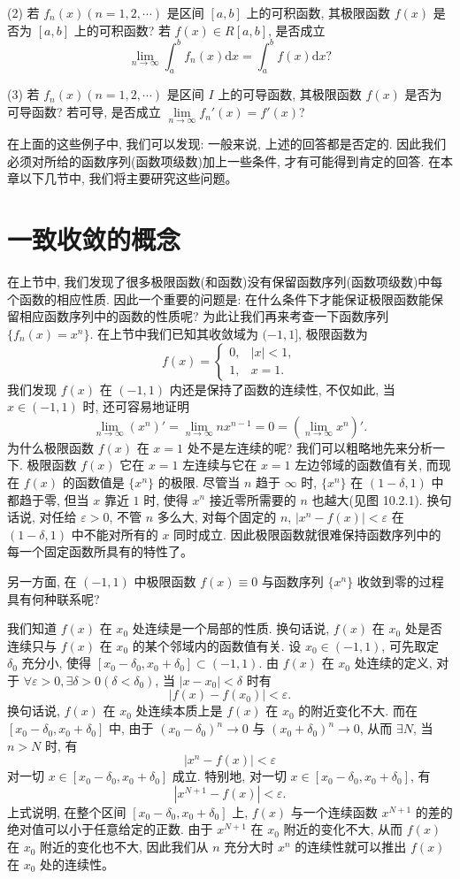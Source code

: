 \documentclass[UTF8,12pt,a4paper,fontset=fandol]{ctexart}
\begin{document}
(2) 若 $f_n(x)(n=1,2,\cdots)$ 是区间 $[a,b]$ 上的可积函数, 其极限函数 $f(x)$ 是否为 $[a,b]$ 上的可积函数? 若 $f(x)\in R[a,b]$, 是否成立
\[
  \lim_{n\to\infty}\int_a^b f_n(x)\mathrm dx=\int_a^b f(x)\mathrm dx?
\]

(3) 若 $f_n(x)(n=1,2,\cdots)$ 是区间 $I$ 上的可导函数, 其极限函数 $f(x)$ 是否为可导函数? 若可导, 是否成立 $\lim\limits_{n\to\infty}f_n'(x)=f'(x)$?

在上面的这些例子中, 我们可以发现: 一般来说, 上述的回答都是否定的. 因此我们必须对所给的函数序列(函数项级数)加上一些条件, 才有可能得到肯定的回答. 在本章以下几节中, 我们将主要研究这些问题。

\section{一致收敛的概念}

在上节中, 我们发现了很多极限函数(和函数)没有保留函数序列(函数项级数)中每个函数的相应性质. 因此一个重要的问题是: 在什么条件下才能保证极限函数能保留相应函数序列中的函数的性质呢? 为此让我们再来考查一下函数序列 $\{f_n(x)=x^n\}$. 在上节中我们已知其收敛域为 $(-1,1]$, 极限函数为
\[
  f(x)=
  \begin{cases}
    0, & |x|<1,\\
    1, & x=1.
  \end{cases}
\]
我们发现 $f(x)$ 在 $(-1,1)$ 内还是保持了函数的连续性, 不仅如此, 当 $x\in(-1,1)$ 时, 还可容易地证明
\[
  \lim_{n\to\infty}(x^n)'=\lim_{n\to\infty}nx^{n-1}=0=\left(\lim_{n\to\infty}x^n\right)'.
\]
为什么极限函数 $f(x)$ 在 $x=1$ 处不是左连续的呢? 我们可以粗略地先来分析一下. 极限函数 $f(x)$ 它在 $x=1$ 左连续与它在 $x=1$ 左边邻域的函数值有关, 而现在 $f(x)$ 的函数值是 $\{x^n\}$ 的极限. 尽管当 $n$ 趋于 $\infty$ 时, $\{x^n\}$ 在 $(1-\delta,1)$ 中都趋于零, 但当 $x$ 靠近 $1$ 时, 使得 $x^n$ 接近零所需要的 $n$ 也越大(见图 10.2.1). 换句话说, 对任给 $\varepsilon>0$, 不管 $n$ 多么大, 对每个固定的 $n$, $|x^n-f(x)|<\varepsilon$ 在 $(1-\delta,1)$ 中不能对所有的 $x$ 同时成立. 因此极限函数就很难保持函数序列中的每一个固定函数所具有的特性了。

另一方面, 在 $(-1,1)$ 中极限函数 $f(x)\equiv0$ 与函数序列 $\{x^n\}$ 收敛到零的过程具有何种联系呢?

我们知道 $f(x)$ 在 $x_0$ 处连续是一个局部的性质. 换句话说, $f(x)$ 在 $x_0$ 处是否连续只与 $f(x)$ 在 $x_0$ 的某个邻域内的函数值有关. 设 $x_0\in(-1,1)$, 可先取定 $\delta_0$ 充分小, 使得 $[x_0-\delta_0,x_0+\delta_0]\subset(-1,1)$. 由 $f(x)$ 在 $x_0$ 处连续的定义, 对于 $\forall\varepsilon>0,\exists\delta>0(\delta<\delta_0)$, 当 $|x-x_0|<\delta$ 时有
\[
  |f(x)-f(x_0)|<\varepsilon.
\]
换句话说, $f(x)$ 在 $x_0$ 处连续本质上是 $f(x)$ 在 $x_0$ 的附近变化不大. 而在 $[x_0-\delta_0,x_0+\delta_0]$ 中, 由于 $(x_0-\delta_0)^n\to0$ 与 $(x_0+\delta_0)^n\to0$, 从而 $\exists N$, 当 $n>N$ 时, 有
\[
  |x^n-f(x)|<\varepsilon
\]
对一切 $x\in[x_0-\delta_0,x_0+\delta_0]$ 成立. 特别地, 对一切 $x\in[x_0-\delta_0,x_0+\delta_0]$, 有
\[
  |x^{N+1}-f(x)|<\varepsilon.
\]
上式说明, 在整个区间 $[x_0-\delta_0,x_0+\delta_0]$ 上, $f(x)$ 与一个连续函数 $x^{N+1}$ 的差的绝对值可以小于任意给定的正数. 由于 $x^{N+1}$ 在 $x_0$ 附近的变化不大, 从而 $f(x)$ 在 $x_0$ 附近的变化也不大, 因此我们从 $n$ 充分大时 $x^n$ 的连续性就可以推出 $f(x)$ 在 $x_0$ 处的连续性。
\end{document}
